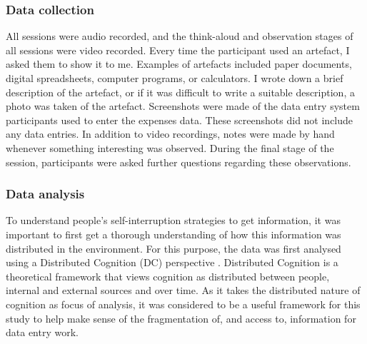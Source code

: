 \subsubsection{Data collection}
All sessions were audio recorded, and the think-aloud and observation stages of all sessions were video recorded. Every time the participant used an artefact, I asked them to show it to me. Examples of artefacts included paper documents, digital spreadsheets, computer programs, or calculators. I wrote down a brief description of the artefact, or if it was difficult to write a suitable description, a photo was taken of the artefact. Screenshots were made of the data entry system participants used to enter the expenses data. These screenshots did not include any data entries. In addition to video recordings, notes were made by hand whenever something interesting was observed. During the final stage of the session, participants were asked further questions regarding these observations.

\subsubsection{Data analysis}
To understand people’s self-interruption strategies to get information, it was important to first get a thorough understanding of how this information was distributed in the environment. For this purpose, the data was first analysed using a Distributed Cognition (DC) perspective \citep{Hutchins1995}. Distributed Cognition is a theoretical framework that views cognition as distributed between people, internal and external sources and over time. As it takes the distributed nature of cognition as focus of analysis, it was considered to be a useful framework for this study to help make sense of the fragmentation of, and access to, information for data entry work. 

